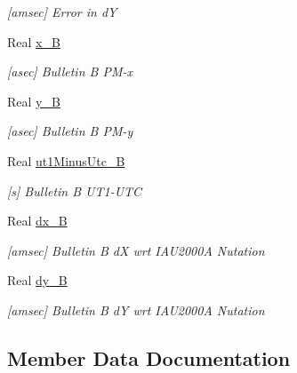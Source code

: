 \begin{DoxyCompactItemize}
\begin{DoxyCompactList}\small\item\em \mbox{[}amsec\mbox{]} Error in dY \end{DoxyCompactList}\item 
Real \hyperlink{structostk_1_1physics_1_1coord_1_1frame_1_1provider_1_1iers_1_1_finals2000_a_1_1_data_a6baed72b8767c3d17420a68ae703ddc3}{x\+\_\+B}
\begin{DoxyCompactList}\small\item\em \mbox{[}asec\mbox{]} Bulletin B P\+M-\/x \end{DoxyCompactList}\item 
Real \hyperlink{structostk_1_1physics_1_1coord_1_1frame_1_1provider_1_1iers_1_1_finals2000_a_1_1_data_a82ef3d8cef516dc3bba282e2225ba7e3}{y\+\_\+B}
\begin{DoxyCompactList}\small\item\em \mbox{[}asec\mbox{]} Bulletin B P\+M-\/y \end{DoxyCompactList}\item 
Real \hyperlink{structostk_1_1physics_1_1coord_1_1frame_1_1provider_1_1iers_1_1_finals2000_a_1_1_data_ae68ef2453941d562eb9f1fefa7b0feed}{ut1\+Minus\+Utc\+\_\+B}
\begin{DoxyCompactList}\small\item\em \mbox{[}s\mbox{]} Bulletin B U\+T1-\/\+U\+TC \end{DoxyCompactList}\item 
Real \hyperlink{structostk_1_1physics_1_1coord_1_1frame_1_1provider_1_1iers_1_1_finals2000_a_1_1_data_a3f3aaca6e39cdfe00de56294fc407740}{dx\+\_\+B}
\begin{DoxyCompactList}\small\item\em \mbox{[}amsec\mbox{]} Bulletin B dX wrt I\+A\+U2000A Nutation \end{DoxyCompactList}\item 
Real \hyperlink{structostk_1_1physics_1_1coord_1_1frame_1_1provider_1_1iers_1_1_finals2000_a_1_1_data_ad76b95701234f2192f11b494bc9ee0e9}{dy\+\_\+B}
\begin{DoxyCompactList}\small\item\em \mbox{[}amsec\mbox{]} Bulletin B dY wrt I\+A\+U2000A Nutation \end{DoxyCompactList}\end{DoxyCompactItemize}


\subsection{Member Data Documentation}
\mbox{\label{structostk_1_1physics_1_1coord_1_1frame_1_1provider_1_1iers_1_1_finals2000_a_1_1_data_a13410abac810082e6ba0baf1d12bb68f}} 
